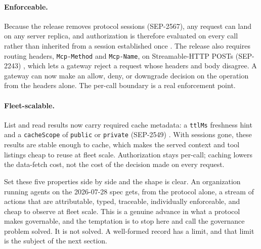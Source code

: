 \paragraph{Enforceable.} Because the release removes protocol sessions
(SEP-2567), any request can land on any server replica, and authorization is
therefore evaluated on every call rather than inherited from a session
established once \citep{sep2567}. The release also requires routing headers,
\texttt{Mcp-Method} and \texttt{Mcp-Name}, on Streamable-HTTP POSTs (SEP-2243)
\citep{mcpchangelog}, which lets a gateway reject a request whose headers and
body disagree. A gateway can now make an allow, deny, or downgrade decision on
the operation from the headers alone. The per-call boundary is a real
enforcement point.

\paragraph{Fleet-scalable.} List and read results now carry required cache
metadata: a \texttt{ttlMs} freshness hint and a \texttt{cacheScope} of
\texttt{public} or \texttt{private} (SEP-2549) \citep{mcpchangelog}. With
sessions gone, these results are stable enough to cache, which makes the served
context and tool listings cheap to reuse at fleet scale. Authorization stays
per-call; caching lowers the data-fetch cost, not the cost of the decision made
on every request.

Set these five properties side by side and the shape is clear. An organization
running agents on the 2026-07-28 spec gets, from the protocol alone, a stream of
actions that are attributable, typed, traceable, individually enforceable, and
cheap to observe at fleet scale. This is a genuine advance in what a protocol
makes governable, and the temptation is to stop here and call the governance
problem solved. It is not solved. A well-formed record has a limit, and that
limit is the subject of the next section.
